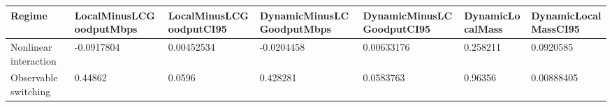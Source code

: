 \begin{tabular}{lllllll}
\toprule
Regime & LocalMinusLCGoodputMbps & LocalMinusLCGoodputCI95 & DynamicMinusLCGoodputMbps & DynamicMinusLCGoodputCI95 & DynamicLocalMass & DynamicLocalMassCI95 \\ 
\midrule
Nonlinear interaction & -0.0917804 & 0.00452534 & -0.0204458 & 0.00633176 & 0.258211 & 0.0920585 \\ 
Observable switching & 0.44862 & 0.0596 & 0.428281 & 0.0583763 & 0.96356 & 0.00888405 \\ 
\bottomrule
\end{tabular}
